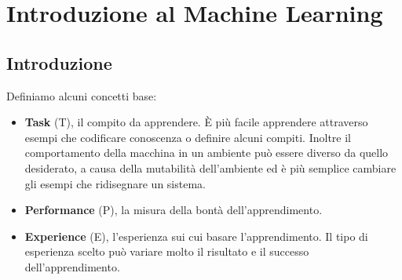 \chapter{Introduzione al Machine Learning}
\section{Introduzione}
Definiamo alcuni concetti base:
\begin{itemize}
    \item \textbf{Task} (T), il compito da apprendere. È più facile apprendere attraverso esempi che codificare conoscenza o definire alcuni compiti. Inoltre il comportamento della macchina in un ambiente può essere diverso da quello desiderato, a causa della mutabilità dell'ambiente ed è più semplice cambiare gli esempi che ridisegnare un sistema.
    \item \textbf{Performance} (P), la misura della bontà dell'apprendimento.
    \item \textbf{Experience} (E), l'esperienza sui cui basare l'apprendimento. Il tipo di esperienza scelto può variare molto il risultato e il successo dell'apprendimento.
\end{itemize}

